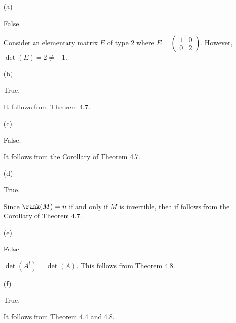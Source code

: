 \begin{Exercise}
	\begin{enumerate}[(a)]
		\item[(a)]
		\begin{answer}
			False.
		\end{answer}
		\begin{solution}
			Consider an elementary matrix $E$ of type 2 where $E = \begin{pmatrix}
			1 & 0 \\
			0 & 2 
			\end{pmatrix}$. However, $\det(E) = 2 \neq \pm 1$.
		\end{solution}
		
		\item[(b)]
		\begin{answer}
			True.
		\end{answer}
		\begin{solution}
			It follows from Theorem 4.7.
		\end{solution}
		
		\item[(c)]
		\begin{answer}
			False.
		\end{answer}
		\begin{solution}
			It follows from the Corollary of Theorem 4.7.
		\end{solution}
		
		\item[(d)]
		\begin{answer}
			True.
		\end{answer}
		\begin{solution}
			Since $\rank(M) = n$ if and only if $M$ is invertible, then if follows from the Corollary of Theorem 4.7.
		\end{solution}
		
		\item[(e)]
		\begin{answer}
			False.
		\end{answer}
		\begin{solution}
			$\det(A^t) = \det(A)$. This follows from Theorem 4.8.
		\end{solution}
		
		\item[(f)]
		\begin{answer}
			True.
		\end{answer}
		\begin{solution}
			It follows from Theorem 4.4 and 4.8.
		\end{solution}
		

\end{enumerate}
\end{Exercise}
